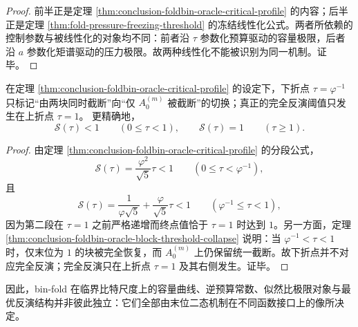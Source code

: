 \begin{proof}
前半正是定理 \ref{thm:conclusion-foldbin-oracle-critical-profile} 的内容；后半正是定理 \ref{thm:fold-pressure-freezing-threshold} 的冻结线性化公式。两者所依赖的控制参数与被线性化的对象均不同：前者沿 \(\tau\) 参数化预算驱动的容量极限，后者沿 \(a\) 参数化矩谱驱动的压力极限。故两种线性化不能被识别为同一机制。证毕。
\end{proof}

\begin{corollary}[完全反演只对应上折点]\label{cor:conclusion-binfold-full-inversion-upper-kink-only}
在定理 \ref{thm:conclusion-foldbin-oracle-critical-profile} 的设定下，下折点
\(
\tau=\varphi^{-1}
\)
只标记“由两块同时截断”向“仅 \(A_0^{(m)}\) 被截断”的切换；真正的完全反演阈值只发生在上折点
\(
\tau=1
\)。
更精确地，
\[
\mathscr S(\tau)<1 \qquad (0\le \tau<1),
\qquad
\mathscr S(\tau)=1 \qquad (\tau\ge 1).
\]
\end{corollary}

\begin{proof}
由定理 \ref{thm:conclusion-foldbin-oracle-critical-profile} 的分段公式，
\[
\mathscr S(\tau)=
\frac{\varphi^2}{\sqrt5}\tau<1
\qquad (0\le \tau<\varphi^{-1}),
\]
且
\[
\mathscr S(\tau)=
\frac{1}{\varphi\sqrt5}+\frac{\varphi}{\sqrt5}\tau<1
\qquad (\varphi^{-1}\le \tau<1),
\]
因为第二段在 \(\tau=1\) 之前严格递增而终点值恰于 \(\tau=1\) 时达到 \(1\)。另一方面，定理 \ref{thm:conclusion-foldbin-oracle-block-threshold-collapse} 说明：当 \(\varphi^{-1}<\tau<1\) 时，仅末位为 \(1\) 的块被完全恢复，而 \(A_0^{(m)}\) 上仍保留统一截断。故下折点并不对应完全反演；完全反演只在上折点 \(\tau=1\) 及其右侧发生。证毕。
\end{proof}



因此，bin-fold 在临界比特尺度上的容量曲线、逆预算常数、似然比极限对象与最优反演结构并非彼此独立：它们全部由末位二态机制在不同函数接口上的像所决定。
